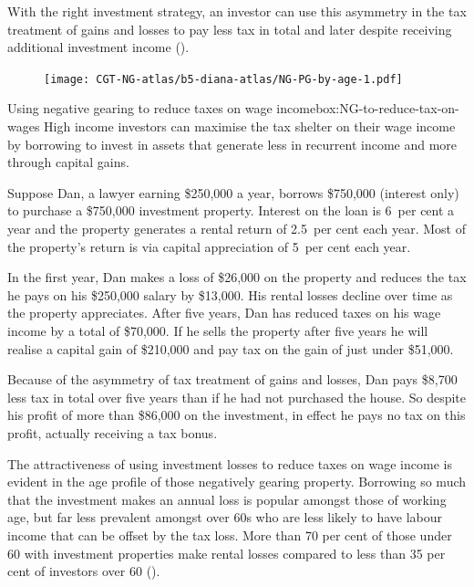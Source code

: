 With the right investment strategy, an investor can use this asymmetry
in the tax treatment of gains and losses to pay less tax in total and
later despite receiving additional investment income ().

\begin{figure}[p]
\texttt{[image: CGT-NG-atlas/b5-diana-atlas/NG-PG-by-age-1.pdf]}
\end{figure}

\begin{smallbox}{Using negative gearing to reduce taxes on wage income}{box:NG-to-reduce-tax-on-wages}
High income investors can maximise the tax shelter on their wage income
by borrowing to invest in assets that generate less in recurrent income
and more through capital gains.



Suppose Dan, a lawyer earning \$250,000 a year, 
borrows \$750,000 %
(interest only)
to purchase a \$750,000 investment property. Interest on the loan is 6~per cent a
year and the property generates a rental return of 2.5~per cent each
year. Most of the property's return is via capital appreciation of 5~per cent each year.

In the first year, Dan makes a loss of \$26,000 
on the property and
reduces the tax he pays on his \$250,000 salary by 
\$13,000. His rental
losses decline over time as the property appreciates. After five years,
Dan has reduced taxes on his wage income by a total of 
\$70,000. If he
sells the property after five years he will realise a capital gain of
\$210,000 and pay tax on 
the gain of just under \$51,000.

Because of the asymmetry of tax treatment of gains and losses, Dan pays
\$8,700 less tax in total over five years than if he had not purchased
the house. So despite his profit of more than \$86,000 on the
investment, in effect he pays no tax on this profit, actually receiving a tax bonus.
\end{smallbox}

The attractiveness of using investment losses to reduce taxes on wage income is evident in the age profile of those negatively gearing property. Borrowing so much that the investment makes an annual loss is popular amongst those of working age, but far less prevalent amongst over 60s who are less likely to have labour income that can be offset by the tax loss. More than 70 per cent of those under 60 with investment properties make rental losses compared to less than 35 per cent of investors over 60 ().

